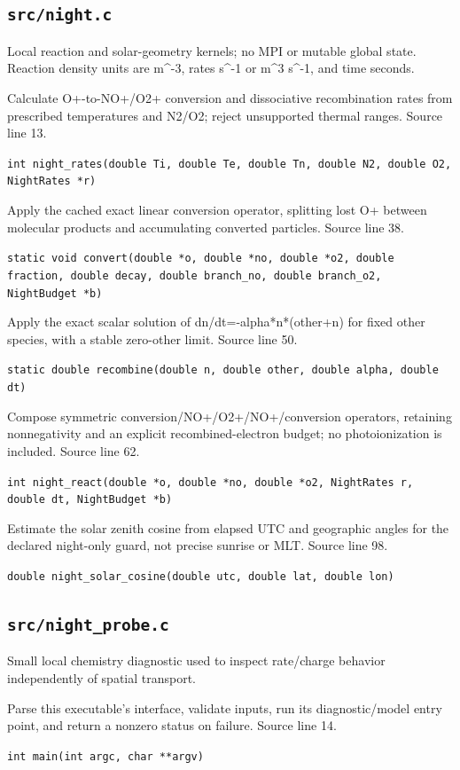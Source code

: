 \subsection{\texttt{src/night.c}}
Local reaction and solar-geometry kernels; no MPI or mutable global state. Reaction density units are m\textasciicircum{}-3, rates s\textasciicircum{}-1 or m\textasciicircum{}3 s\textasciicircum{}-1, and time seconds.
\begin{description}[style=nextline,leftmargin=0pt,labelindent=0pt,labelwidth=0pt,labelsep=0pt]
\item[\texttt{night\_rates}] Calculate O+-to-NO+/O2+ conversion and dissociative recombination rates from prescribed temperatures and N2/O2; reject unsupported thermal ranges. Source line 13.\par
{\small\nolinkurl{int night_rates(double Ti, double Te, double Tn, double N2, double O2, NightRates *r)}}
\item[\texttt{convert}] Apply the cached exact linear conversion operator, splitting lost O+ between molecular products and accumulating converted particles. Source line 38.\par
{\small\nolinkurl{static void convert(double *o, double *no, double *o2, double fraction, double decay, double branch_no, double branch_o2, NightBudget *b)}}
\item[\texttt{recombine}] Apply the exact scalar solution of dn/dt=-alpha*n*(other+n) for fixed other species, with a stable zero-other limit. Source line 50.\par
{\small\nolinkurl{static double recombine(double n, double other, double alpha, double dt)}}
\item[\texttt{night\_react}] Compose symmetric conversion/NO+/O2+/NO+/conversion operators, retaining nonnegativity and an explicit recombined-electron budget; no photoionization is included. Source line 62.\par
{\small\nolinkurl{int night_react(double *o, double *no, double *o2, NightRates r, double dt, NightBudget *b)}}
\item[\texttt{night\_solar\_cosine}] Estimate the solar zenith cosine from elapsed UTC and geographic angles for the declared night-only guard, not precise sunrise or MLT. Source line 98.\par
{\small\nolinkurl{double night_solar_cosine(double utc, double lat, double lon)}}
\end{description}
\subsection{\texttt{src/night\_probe.c}}
Small local chemistry diagnostic used to inspect rate/charge behavior independently of spatial transport.
\begin{description}[style=nextline,leftmargin=0pt,labelindent=0pt,labelwidth=0pt,labelsep=0pt]
\item[\texttt{main}] Parse this executable's interface, validate inputs, run its diagnostic/model entry point, and return a nonzero status on failure. Source line 14.\par
{\small\nolinkurl{int main(int argc, char **argv)}}
\end{description}
